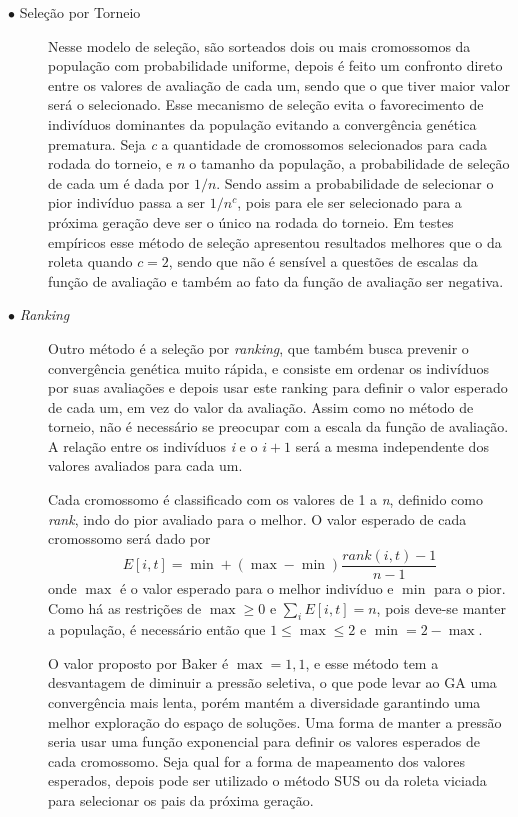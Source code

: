 \begin{description}
\item[$\bullet$ Seleção por Torneio] \text{}

Nesse modelo de seleção, são sorteados dois ou mais cromossomos da população com probabilidade uniforme, depois é feito um confronto direto entre os valores de avaliação de cada um, sendo que o que tiver maior valor será o selecionado. Esse mecanismo de seleção evita o favorecimento de indivíduos dominantes da população evitando a convergência genética prematura. Seja \textit{c} a quantidade de cromossomos selecionados para cada rodada do torneio, e \textit{n} o tamanho da população, a probabilidade de seleção de cada um é dada por \(1/n\). Sendo assim a probabilidade de selecionar o pior indivíduo passa a ser \(1/n^c\), pois para ele ser selecionado para a próxima geração deve ser o único na rodada do torneio. Em testes empíricos esse método de seleção apresentou resultados melhores que o da roleta quando \(c=2\), sendo que não é sensível a questões de escalas da função de avaliação e também ao fato da função de avaliação ser negativa. \cite{Linden2008}

\item[$\bullet$ \textit{Ranking}] \text{}

Outro método é a seleção por \textit{ranking}, que também busca prevenir o convergência genética muito rápida, e consiste em ordenar os indivíduos por suas avaliações e depois usar este ranking para definir o valor esperado de cada um, em vez do valor da avaliação. Assim como no método de torneio, não é necessário se preocupar com a escala da função de avaliação. A relação entre os indivíduos \textit{i} e o \(i+1\) será a mesma independente dos valores avaliados para cada um. 

Cada cromossomo é classificado com os valores de 1 a \textit{n}, definido como \textit{rank}, indo do pior avaliado para o melhor. O valor esperado de cada cromossomo será dado por \[E[i,t] = \min + (\max - \min) \frac{rank(i,t) - 1}{n - 1} \] onde \(\max\) é o valor esperado para o melhor indivíduo e \(\min\) para o pior. Como há as restrições de \(\max \geq 0\) e \(\sum_i E[i,t] = n\), pois deve-se manter a população, é necessário então que \(1 \leq \max \leq 2\) e \(\min = 2 - \max\).

O valor proposto por Baker é \(\max = 1,1\), e esse método tem a desvantagem de diminuir a pressão seletiva, o que pode levar ao GA uma convergência mais lenta, porém mantém a diversidade garantindo uma melhor exploração do espaço de soluções. Uma forma de manter a pressão seria usar uma função exponencial para definir os valores esperados de cada cromossomo. Seja qual for a forma de mapeamento dos valores esperados, depois pode ser utilizado o método SUS ou da roleta viciada para selecionar os pais da próxima geração.\cite{Mitchell1996}



\end{description}
